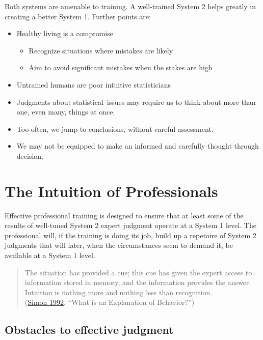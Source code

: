 \documentclass[
  10ptls,
  b5paper]{book}
\providecommand{\tightlist}{%
  \setlength{\itemsep}{0pt}\setlength{\parskip}{0pt}}
\begin{document}
Both systems are amenable to training. A well-trained System 2 helps
greatly in creating a better System 1. Further points are:

\begin{itemize}
\tightlist
\item
  Healthy living is a compromise

  \begin{itemize}
  \tightlist
  \item
    Recognize situations where mistakes are likely
  \item
    Aim to avoid significant mistakes when the stakes are high
  \end{itemize}
\item
  Untrained humans are poor intuitive statisticians
\item
  Judgments about statistical~issues may require us to think about more than one, even many, things at once.
\item
  Too often, we jump to conclusions, without careful assessment.
\item
  We may not be equipped to make an informed and carefully thought through decision.
\end{itemize}

\hypertarget{the-intuition-of-professionals}{%
\section{The Intuition of Professionals}\label{the-intuition-of-professionals}}

Effective professional training is designed to ensure that at least some of the results of well-tuned System 2 expert judgment operate at a System 1 level.
The professional will, if the training is doing its job, build up a
repetoire of System 2 judgments that will later, when the circumstances
seem to demand it, be available at a System 1 level.

\begin{quote}
The situation has provided a cue; this cue has given the expert access to information stored in memory, and the information provides the answer. Intuition is nothing more and nothing less than recognition.\\
(\protect\hyperlink{ref-simon1992explanation}{Simon 1992}, ``What is an Explanation of Behavior?'')
\end{quote}

\hypertarget{obstacles-to-effective-judgment}{%
\subsection*{Obstacles to effective judgment}\label{obstacles-to-effective-judgment}}
\end{document}
